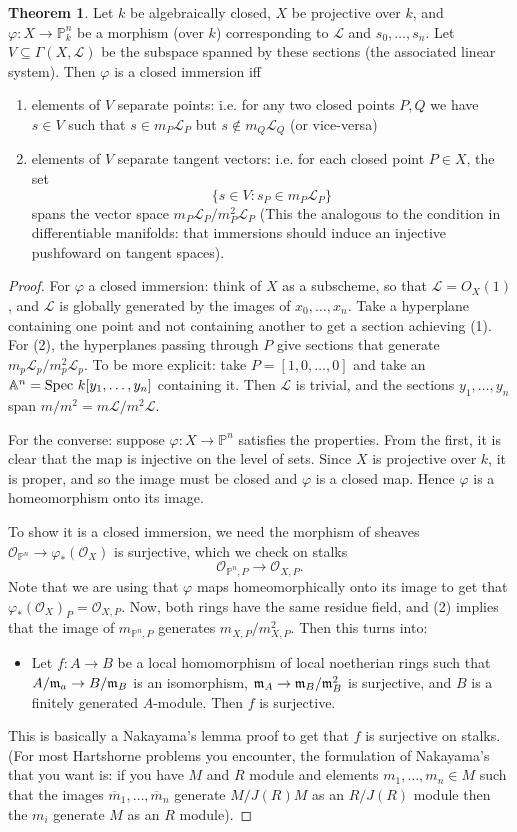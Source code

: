 \documentclass[10pt,reqno]{amsart}
\theoremstyle{definition}
\newtheorem{theorem}{Theorem}
\theoremstyle{remark}
\numberwithin{equation}{section}
\numberwithin{theorem}{section}
\newcommand{\OO}{{\mathcal O}}
\newcommand{\spec}{\textup{Spec }}
\newcommand{\LL}{{\mathscr L}}
\newcommand{\mm}{\frak{m}}
\newcommand{\A}{{\mathbb A}}
\newcommand{\PP}{{\mathbb P}}
\begin{document}
\begin{theorem} Let $k$ be algebraically closed, $X$ be projective over $k$, and $\varphi: X \to \PP^n_k$ be a morphism (over $k$) corresponding to $\LL$ and $s_0,\dots,s_n$. Let $V \subseteq \Gamma(X,\LL)$ be the subspace spanned by these sections (the associated linear system). Then $\varphi$ is a closed immersion iff
\begin{enumerate}[(1)]
\item elements of $V$ separate points: i.e. for any two closed points $P,Q$ we have $s \in V$ such that $s \in m_P \LL_P$ but $s \not \in m_Q \LL_Q$ (or vice-versa)
\item elements of $V$ separate tangent vectors: i.e. for each closed point $P \in X$, the set
\[\{s \in V: s_P \in m_P \LL_P\}\]
spans the vector space $m_P\LL_P/m_P^2 \LL_P$ (This the analogous to the condition in differentiable manifolds: that immersions should induce an injective pushfoward on tangent spaces).
\end{enumerate}
\end{theorem}
\begin{proof}
For $\varphi$ a closed immersion: think of $X$ as a subscheme, so that $\LL = O_X(1)$, and  $\LL$ is globally generated by the images of $x_0,\dots,x_n$. Take a hyperplane containing one point and not containing another to get a section achieving (1). For (2), the hyperplanes passing through $P$ give sections that generate $m_p \LL_p/m_p^2 \LL_p$. To be more explicit: take $P = [1,0,\dots,0]$ and take an $\A^n = \spec k[y_1,\dots,y_n]$ containing it. Then $\LL$ is trivial, and the sections $y_1,\dots,y_n$ span $m/m^2 = m\LL/m^2\LL$.

For the converse: suppose $\varphi: X \to \PP^n$ satisfies the properties. From the first, it is clear that the map is injective on the level of sets. Since $X$ is projective over $k$, it is proper, and so the image must be closed and $\varphi$ is a closed map. Hence $\varphi$ is a homeomorphism onto its image.

To show it is a closed immersion, we need the morphism of sheaves $\OO_{\PP^n} \to \varphi_*(\OO_X)$ is surjective, which we check on stalks
\[\OO_{\PP^n,P} \to \OO_{X,P}.\]
Note that we are using that $\varphi$ maps homeomorphically onto its image to get that $\varphi_*(\OO_{X})_P = \OO_{X,P}$. Now, both rings have the same residue field, and (2) implies that the image of $m_{\PP^n,P}$ generates $m_{X,P}/m_{X,P}^2$. Then this turns into:
\begin{itemize}
\item Let $f: A \to  B$ be a local homomorphism of local noetherian rings such that $A/\mm_a \to B/\mm_B$ is an isomorphism, $\mm_A \to \mm_B/\mm_B^2$ is surjective, and $B$ is a finitely generated $A$-module. Then $f$ is surjective.
\end{itemize}
This is basically a Nakayama's lemma proof to get that $f$ is surjective on stalks.  (For most Hartshorne problems you encounter, the formulation of Nakayama's that you want is: if you have $M$ and $R$ module and elements $m_1,\dots,m_n \in M$ such that the images $\overline{m}_1,\dots,\overline{m}_n$ generate $M/J(R)M$ as an $R/J(R)$ module then the $m_i$ generate $M$ as an $R$ module). 
\end{proof}
\end{document}
